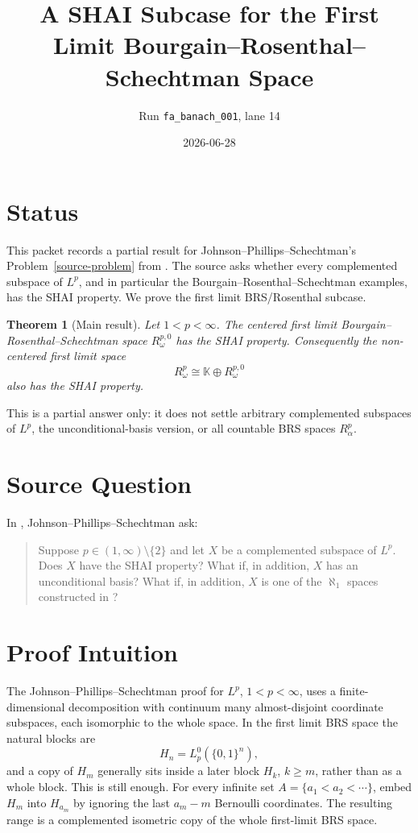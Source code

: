 \documentclass[11pt]{article}
\title{A SHAI Subcase for the First Limit Bourgain--Rosenthal--Schechtman Space}
\author{Run \texttt{fa\_banach\_001}, lane 14}
\date{2026-06-28}
\newtheorem{theorem}{Theorem}
\begin{document}
\maketitle

\section*{Status}

This packet records a partial result for Johnson--Phillips--Schechtman's
Problem~\ref{source-problem} from \cite{JPS}.  The source asks whether every
complemented subspace of \(L^p\), and in particular the
Bourgain--Rosenthal--Schechtman examples, has the SHAI property.  We prove the
first limit BRS/Rosenthal subcase.

\begin{theorem}[Main result]
\label{main}
Let \(1<p<\infty\).  The centered first limit
Bourgain--Rosenthal--Schechtman space \(R_\omega^{p,0}\) has the SHAI property.
Consequently the non-centered first limit space
\[
  R_\omega^p \cong \mathbb K \oplus R_\omega^{p,0}
\]
also has the SHAI property.
\end{theorem}

This is a partial answer only: it does not settle arbitrary complemented
subspaces of \(L^p\), the unconditional-basis version, or all countable BRS
spaces \(R_\alpha^p\).

\section*{Source Question}

In \cite[Problem 2.7]{JPS}, Johnson--Phillips--Schechtman ask:

\begin{quote}
\label{source-problem}
Suppose \(p\in(1,\infty)\setminus\{2\}\) and let \(X\) be a complemented
subspace of \(L^p\). Does \(X\) have the SHAI property? What if, in addition,
\(X\) has an unconditional basis? What if, in addition, \(X\) is one of the
\(\aleph_1\) spaces constructed in \cite{BRS}?
\end{quote}

\section*{Proof Intuition}

The Johnson--Phillips--Schechtman proof for \(L^p\), \(1<p<\infty\), uses a
finite-dimensional decomposition with continuum many almost-disjoint
coordinate subspaces, each isomorphic to the whole space.  In the first limit
BRS space the natural blocks are
\[
  H_n=L_p^0(\{0,1\}^n),
\]
and a copy of \(H_m\) generally sits inside a later block \(H_k\), \(k\ge m\),
rather than as a whole block.  This is still enough.  For every infinite
set \(A=\{a_1<a_2<\cdots\}\), embed \(H_m\) into \(H_{a_m}\) by ignoring the
last \(a_m-m\) Bernoulli coordinates.  The resulting range is a complemented
isometric copy of the whole first-limit BRS space.
\end{document}
